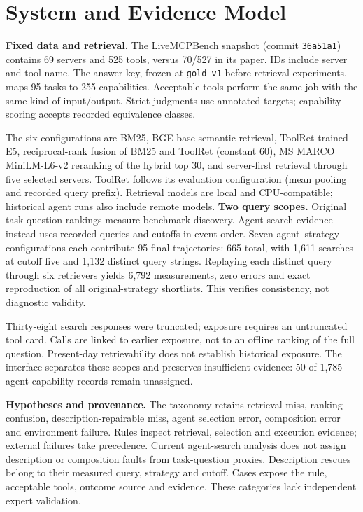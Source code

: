 \documentclass[runningheads,a4paper]{llncs}
\begin{document}
\section{System and Evidence Model}
\label{sec:system}
\textbf{Fixed data and retrieval.} The LiveMCPBench snapshot (commit \texttt{36a51a1}) contains 69 servers and 525 tools, versus 70/527 in its paper. IDs include server and tool name. The answer key, frozen at \texttt{gold-v1} before retrieval experiments, maps 95 tasks to 255 capabilities. Acceptable tools perform the same job with the same kind of input/output. Strict judgments use annotated targets; capability scoring accepts recorded equivalence classes.

The six configurations are BM25, BGE-base semantic retrieval, ToolRet-trained E5, reciprocal-rank fusion of BM25 and ToolRet (constant 60), MS MARCO MiniLM-L6-v2 reranking of the hybrid top 30, and server-first retrieval through five selected servers. ToolRet follows its evaluation configuration (mean pooling and recorded query prefix). Retrieval models are local and CPU-compatible; historical agent runs also include remote models.
\textbf{Two query scopes.} Original task-question rankings measure benchmark discovery. Agent-search evidence instead uses recorded queries and cutoffs in event order. Seven agent--strategy configurations each contribute 95 final trajectories: 665 total, with 1,611 searches at cutoff five and 1,132 distinct query strings. Replaying each distinct query through six retrievers yields 6,792 measurements, zero errors and exact reproduction of all original-strategy shortlists. This verifies consistency, not diagnostic validity.

Thirty-eight search responses were truncated; exposure requires an untruncated tool card. Calls are linked to earlier exposure, not to an offline ranking of the full question. Present-day retrievability does not establish historical exposure. The interface separates these scopes and preserves insufficient evidence: 50 of 1,785 agent-capability records remain unassigned.

\textbf{Hypotheses and provenance.} The taxonomy retains retrieval miss, ranking confusion, description-repairable miss, agent selection error, composition error and environment failure. Rules inspect retrieval, selection and execution evidence; external failures take precedence. Current agent-search analysis does not assign description or composition faults from task-question proxies. Description rescues belong to their measured query, strategy and cutoff. Cases expose the rule, acceptable tools, outcome source and evidence. These categories lack independent expert validation.
\end{document}
